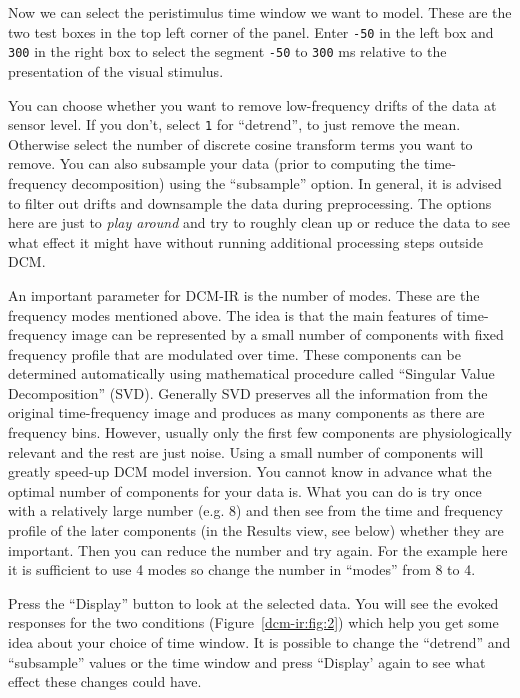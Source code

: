 Now we can select the peristimulus time window we want to model. These are the two test boxes in the top left corner of the panel. Enter \texttt{-50} in the left box and \texttt{300} in the right box to select the segment \texttt{-50} to \texttt{300} ms relative to the presentation of the visual stimulus.  

You can choose whether you want to remove low-frequency drifts of the data at sensor level. If you don't, select \texttt{1} for ``detrend'', to just remove the mean. Otherwise select the number of discrete cosine transform terms you want to remove. You can also subsample your data (prior to computing the time-frequency decomposition) using the ``subsample'' option. In general, it is advised to filter out drifts and downsample the data during preprocessing. The options here are just to \textit{play around} and try to roughly clean up or reduce the data to see what effect it might have without running additional processing steps outside DCM.

An important parameter for DCM-IR is the number of modes. These are the frequency modes mentioned above. The idea is that the main features of time-frequency image can be represented by a small number of components with fixed frequency profile that are modulated over time. These components can be determined automatically using mathematical procedure called ``Singular Value Decomposition'' (SVD). Generally SVD preserves all the information from the original time-frequency image and produces as many components as there are frequency bins. However, usually only the first few components are physiologically relevant and the rest are just noise. Using a small number of components will greatly speed-up DCM model inversion. You cannot know in advance what the optimal number of components for your data is. What you can do is try once with a relatively large number (e.g. 8) and then see from the time and frequency profile of the later components (in the Results view, see below) whether they are important. Then you can reduce the number and try again. For the example here it is sufficient to use 4 modes so change the number in ``modes'' from 8 to 4. 

Press the ``Display'' button to look at the selected data. You will see the evoked responses for the two conditions (Figure~\ref{dcm-ir:fig:2}) which help you get some idea about your choice of time window. It is possible to change the ``detrend'' and ``subsample'' values or the time window and press ``Display' again to see what effect these changes could have. 

